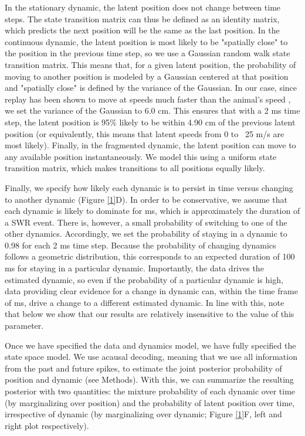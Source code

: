 \documentclass[times, twoside]{zHenriquesLab-StyleBioRxiv}
\begin{document}
In the stationary dynamic, the latent position does not change between time steps. The state transition matrix can thus be defined as an identity matrix, which predicts the next position will be the same as the last position. In the continuous dynamic, the latent position is most likely to be  "spatially close" to the position in the previous time step, so we use a Gaussian random walk state transition matrix. This means that, for a given latent position, the probability of moving to another position is modeled by a Gaussian centered at that position and "spatially close" is defined by the variance of the Gaussian. In our case, since replay has been shown to move at speeds much faster than the animal's speed \cite{DavidsonHippocampalReplayExtended2009, PfeifferAutoassociativedynamicsgeneration2015}, we set the variance of the Gaussian to 6.0 cm. This ensures that with a 2 ms time step, the latent position is 95\% likely to be within 4.90 cm of the previous latent position (or equivalently, this means that latent speeds from 0 to ~25 m/s are most likely).  Finally, in the fragmented dynamic, the latent position can move to any available position instantaneously. We model this using a uniform state transition matrix, which makes transitions to all positions equally likely.

Finally, we specify how likely each dynamic is to persist in time versus changing to another dynamic (Figure \ref{1}D). In order to be conservative, we assume that each dynamic is likely to dominate for  ms, which is approximately the duration of a SWR event. There is, however, a small probability of switching to one of the other dynamics. Accordingly, we set the probability of staying in a dynamic to 0.98 for each 2 ms time step. Because the probability of changing dynamics follows a geometric distribution, this corresponds to an expected duration of 100 ms for staying in a particular dynamic. Importantly, the data drives the estimated dynamic, so even if the probability of a particular dynamic is high, data providing clear evidence for a change in dynamic can, within the time frame of  ms, drive a change to a different estimated dynamic. In line with this, note that below we show that our results are relatively insensitive to the value of this parameter.

Once we have specified the data and dynamics model, we have fully specified the state space model. We use acausal decoding, meaning that we use all information from the past and future spikes, to estimate the joint posterior probability of position and dynamic (see Methods). With this, we can summarize the resulting posterior with two quantities: the mixture probability of each dynamic over time (by marginalizing over position) and the probability of latent position over time, irrespective of dynamic (by marginalizing over dynamic; Figure \ref{1}F, left and right plot respectively). 
\end{document}
